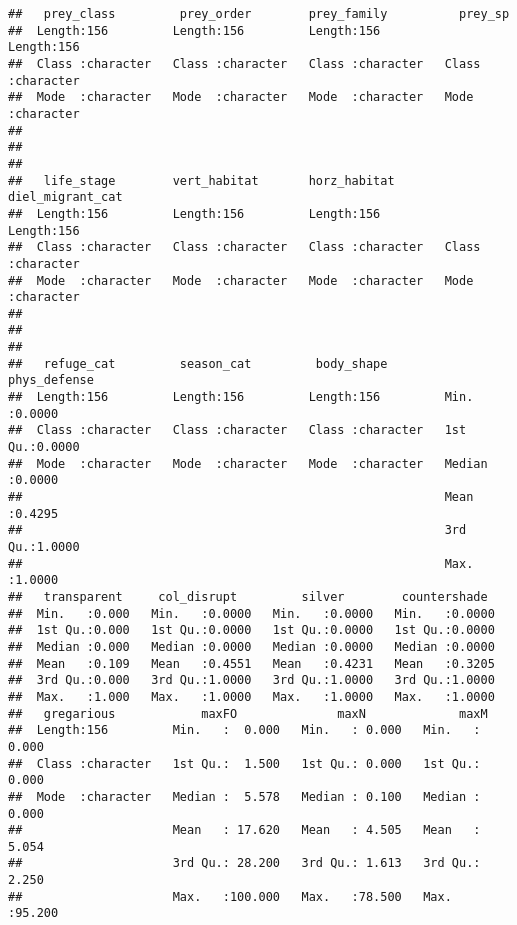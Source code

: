 \documentclass[
]{article}
\begin{document}
\begin{verbatim}
##   prey_class         prey_order        prey_family          prey_sp         
##  Length:156         Length:156         Length:156         Length:156        
##  Class :character   Class :character   Class :character   Class :character  
##  Mode  :character   Mode  :character   Mode  :character   Mode  :character  
##                                                                             
##                                                                             
##                                                                             
##   life_stage        vert_habitat       horz_habitat       diel_migrant_cat  
##  Length:156         Length:156         Length:156         Length:156        
##  Class :character   Class :character   Class :character   Class :character  
##  Mode  :character   Mode  :character   Mode  :character   Mode  :character  
##                                                                             
##                                                                             
##                                                                             
##   refuge_cat         season_cat         body_shape         phys_defense   
##  Length:156         Length:156         Length:156         Min.   :0.0000  
##  Class :character   Class :character   Class :character   1st Qu.:0.0000  
##  Mode  :character   Mode  :character   Mode  :character   Median :0.0000  
##                                                           Mean   :0.4295  
##                                                           3rd Qu.:1.0000  
##                                                           Max.   :1.0000  
##   transparent     col_disrupt         silver        countershade   
##  Min.   :0.000   Min.   :0.0000   Min.   :0.0000   Min.   :0.0000  
##  1st Qu.:0.000   1st Qu.:0.0000   1st Qu.:0.0000   1st Qu.:0.0000  
##  Median :0.000   Median :0.0000   Median :0.0000   Median :0.0000  
##  Mean   :0.109   Mean   :0.4551   Mean   :0.4231   Mean   :0.3205  
##  3rd Qu.:0.000   3rd Qu.:1.0000   3rd Qu.:1.0000   3rd Qu.:1.0000  
##  Max.   :1.000   Max.   :1.0000   Max.   :1.0000   Max.   :1.0000  
##   gregarious            maxFO              maxN             maxM       
##  Length:156         Min.   :  0.000   Min.   : 0.000   Min.   : 0.000  
##  Class :character   1st Qu.:  1.500   1st Qu.: 0.000   1st Qu.: 0.000  
##  Mode  :character   Median :  5.578   Median : 0.100   Median : 0.000  
##                     Mean   : 17.620   Mean   : 4.505   Mean   : 5.054  
##                     3rd Qu.: 28.200   3rd Qu.: 1.613   3rd Qu.: 2.250  
##                     Max.   :100.000   Max.   :78.500   Max.   :95.200
\end{verbatim}
\end{document}
